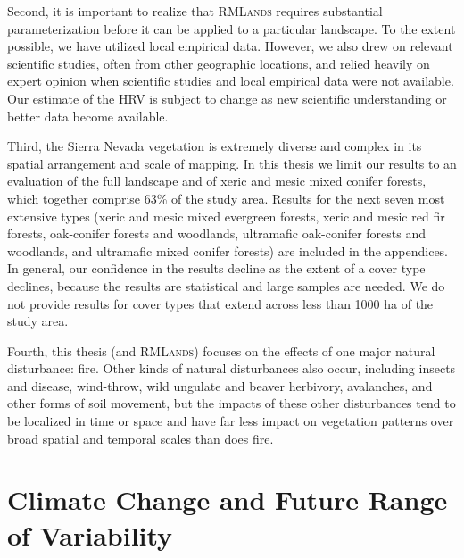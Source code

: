 Second, it is important to realize that \textsc{RMLands} requires substantial parameterization before it can be applied to a particular landscape. To the extent possible, we have utilized local empirical data. However, we also drew on relevant scientific studies, often from other geographic locations, and relied heavily on expert opinion when scientific studies and local empirical data were not available. Our estimate of the HRV is subject to change as new scientific understanding or better data become available.

Third, the Sierra Nevada vegetation is extremely diverse and complex in its spatial arrangement and scale of mapping. In this thesis we limit our results to an evaluation of the full landscape and of xeric and mesic mixed conifer forests, which together comprise 63\% of the study area. Results for the next seven most extensive types (xeric and mesic mixed evergreen forests, xeric and mesic red fir forests, oak-conifer forests and woodlands, ultramafic oak-conifer forests and woodlands, and ultramafic mixed conifer forests) are included in the appendices. In general, our confidence in the results decline as the extent of a cover type declines, because the results are statistical and large samples are needed. We do not provide results for cover types that extend across less than 1000 ha of the study area.

Fourth, this thesis (and \textsc{RMLands}) focuses on the effects of one major natural disturbance: fire. Other kinds of natural disturbances also occur, including insects and disease, wind-throw, wild ungulate and beaver herbivory, avalanches, and other forms of soil movement, but the impacts of these other disturbances tend to be localized in time or space and have far less impact on vegetation patterns over broad spatial and temporal scales than does fire.

\section{Climate Change and Future Range of Variability}


